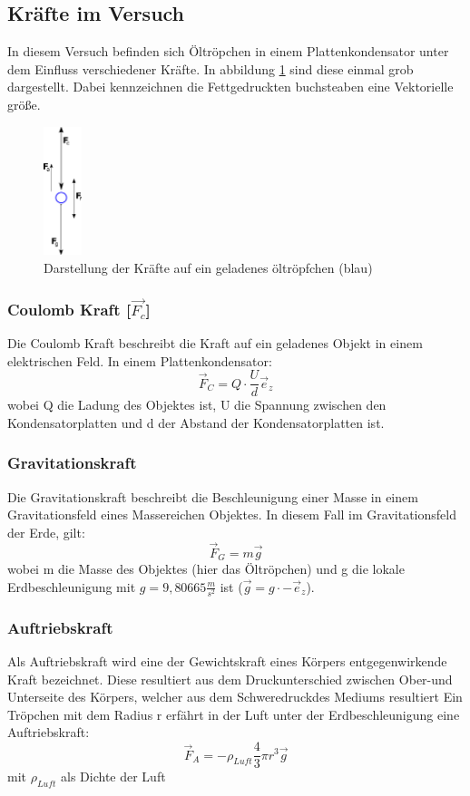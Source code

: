 \documentclass{scrartcl}
\begin{document}
	\subsection{Kräfte im Versuch}
		In diesem Versuch befinden sich Öltröpchen in einem Plattenkondensator unter dem Einfluss verschiedener Kräfte.
		In abbildung \ref{forces} sind diese einmal grob dargestellt. Dabei kennzeichnen die Fettgedruckten buchsteaben eine
		Vektorielle größe.
		\begin{figure}[H]
			\centering
			\includegraphics[width=0.1\textwidth]{kräfte.png} 
			\caption{Darstellung der Kräfte auf ein geladenes öltröpfchen (blau)}
			\label{forces}
		\end{figure}

		\subsubsection{Coulomb Kraft [$\vec{F_c}$]}
			Die Coulomb Kraft beschreibt die Kraft auf ein geladenes Objekt in einem elektrischen Feld.
			In einem Plattenkondensator:
			\begin{equation}
				\vec{F}_C = Q \cdot \frac{U}{d} \vec{e}_z
			\end{equation}
			wobei Q die Ladung des Objektes ist, U die Spannung zwischen den Kondensatorplatten und d der Abstand der Kondensatorplatten ist.	
		\subsubsection{Gravitationskraft}
			Die Gravitationskraft beschreibt die Beschleunigung einer Masse in einem Gravitationsfeld eines Massereichen Objektes.
			In diesem Fall im Gravitationsfeld der Erde, gilt:
			\begin{equation}
				\vec{F}_G = m\vec{g}
			\end{equation}
			wobei m die Masse des Objektes (hier das Öltröpchen) und g die lokale Erdbeschleunigung mit $g = 9,80665 \frac{m}{s^2}$ ist ($\vec{g} = g \cdot -\vec{e}_z$).
		\subsubsection{Auftriebskraft}
			Als Auftriebskraft wird eine der Gewichtskraft eines Körpers entgegenwirkende Kraft bezeichnet. Diese resultiert aus dem Druckunterschied zwischen Ober-und Unterseite des Körpers, welcher aus dem Schweredruckdes Mediums resultiert
			Ein Tröpchen mit dem Radius r erfährt in der Luft unter der Erdbeschleunigung eine Auftriebskraft:
			\begin{equation}
				\vec{F}_A = - \rho_{Luft} \frac{4}{3} \pi r^3 \vec{g}
			\end{equation}
			mit $\rho_{Luft}$ als Dichte der Luft
\end{document}
